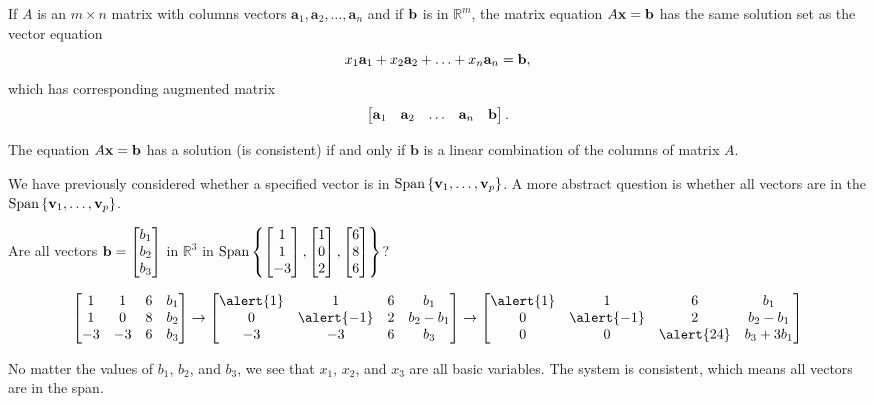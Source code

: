 \documentclass[xcolor=dvipsnames,aspectratio=169,t]{beamer}
\begin{document}
\begin{frame}

\bbox
 If $A$ is an $m \times n$ matrix with columns vectors $\mathbf{a}_1, \mathbf{a}_2, \ldots , \mathbf{a}_n$ and if $\mathbf{b}$ is in $\mathbb{R}^m$, the matrix equation $A\mathbf{x} = \mathbf{b}$ has the \alert{same solution set} as the vector equation
   \[ x_1  \mathbf{a}_1 + x_2  \mathbf{a}_2  + \ldots + x_n  \mathbf{a}_n = \mathbf{b}, \]
   which has corresponding augmented matrix
   \[ \begin{bmatrix} \mathbf{a}_1 & \mathbf{a}_2 & \ldots & \mathbf{a}_n & \mathbf{b} \end{bmatrix}. \]
   \ebox
  
  \begin{theorem}
    The equation $A \mathbf{x} = \mathbf{b}$ has a solution (is consistent) if and only if $\mathbf{b}$ is a linear combination of the columns of matrix $A$.
  \end{theorem}
  
\end{frame}

\begin{frame}

  \bi
  \ii We have previously considered whether a specified  vector is in  $\mbox{Span} \left\{ \mathbf{v}_1,  \ldots , \mathbf{v}_p \right\}$.
  \ii A more abstract question is whether \alert{all vectors} are in the $\mbox{Span} \left\{ \mathbf{v}_1,  \ldots , \mathbf{v}_p \right\}$.
  \ei

  \bbox
  Are all vectors $\displaystyle \mathbf{b} = \begin{bmatrix} b_1 \\ b_2 \\ b_3 \end{bmatrix}$ in $\mathbb{R}^3$ in $\displaystyle \mbox{Span} \left\{ \begin{bmatrix} 1\\ 1\\ -3 \end{bmatrix} ,  \begin{bmatrix} 1 \\ 0 \\ 2 \end{bmatrix} , \begin{bmatrix} 6 \\ 8 \\ 6 \end{bmatrix} \right\}$?
  \ebox

  \ms
  
  \[ \bbm 1 & 1 & 6 & b_1 \\ 1 & 0 & 8 & b_2 \\ -3 & -3 & 6 & b_3 \ebm
\rightarrow  \bbm \alert{1} & 1 & 6 & b_1 \\ 0 & \alert{-1} & 2 & b_2-b_1 \\ -3 & -3 & 6 & b_3 \ebm
  \rightarrow  \bbm \alert{1} & 1 & 6 & b_1 \\ 0 & \alert{-1} & 2 & b_2-b_1 \\ 0 & 0 & \alert{24} & b_3+3b_1 \ebm   \]

  \bbox
  No matter the values of $b_1$, $b_2$, and $b_3$, we see that  $x_1$, $x_2$, and $x_3$ are all \alert{basic variables}. The system is consistent, which means all vectors are in the span.
  \ebox
  
\end{frame}
\end{document}
